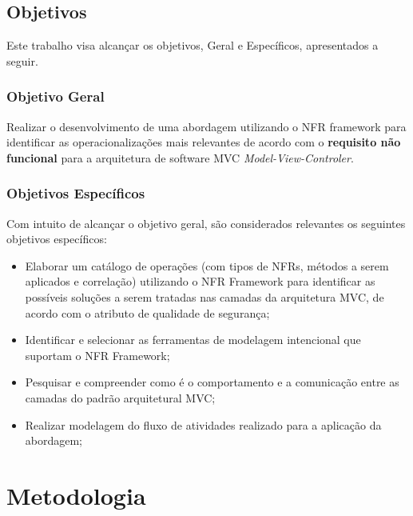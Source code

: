 \section{Objetivos}

Este trabalho visa alcançar os objetivos, Geral e Específicos, apresentados a seguir.  

\subsection{Objetivo Geral}

Realizar o desenvolvimento de uma abordagem utilizando o NFR framework para identificar as operacionalizações mais relevantes de acordo com o \textbf{requisito não funcional} para a arquitetura de software MVC \textit{Model-View-Controler}. 

\subsection{Objetivos Específicos}

Com intuito de alcançar o objetivo geral, são considerados relevantes os seguintes objetivos específicos:

\begin{itemize}
	
	\item Elaborar um catálogo de operações (com tipos de NFRs, métodos a serem aplicados e correlação) utilizando o NFR Framework para identificar as possíveis soluções a serem tratadas nas camadas da arquitetura MVC, de acordo com o atributo de qualidade de segurança;
	
	\item Identificar e selecionar as ferramentas de modelagem intencional que suportam o NFR Framework;
	
	\item Pesquisar e compreender como é o comportamento e a comunicação entre as camadas do padrão arquitetural MVC;
	
	\item Realizar modelagem do fluxo de atividades realizado para a aplicação da abordagem;
\end{itemize}

\chapter{Metodologia}